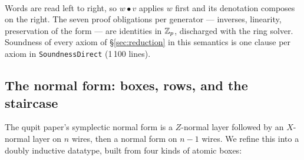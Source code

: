 \begin{code}
\AgdaSymbol{=}\AgdaSpace{}%
\AgdaSymbol{(}\AgdaSpace{}%
\AgdaOperator{\AgdaInductiveConstructor{,}}\AgdaSpace{}%
\AgdaSpace{}%
\AgdaOperator{\AgdaPostulate{+}}\AgdaSpace{}%
\AgdaSymbol{)}\AgdaSpace{}%
\AgdaSpace{}%
\AgdaSymbol{(}\AgdaSpace{}%
\AgdaOperator{\AgdaInductiveConstructor{,}}\AgdaSpace{}%
\AgdaSpace{}%
\AgdaOperator{\AgdaPostulate{+}}\AgdaSpace{}%
\AgdaSymbol{)}\AgdaSpace{}%
\AgdaSpace{}%
\<%
\\
\>[0]\AgdaSpace{}%
\AgdaSymbol{(}\AgdaSpace{}%
\AgdaSymbol{)}%
\>[21]\AgdaSymbol{(}\AgdaSpace{}%
\AgdaSpace{}%
\AgdaSymbol{)}%
\>[48]\AgdaSymbol{=}\AgdaSpace{}%
\AgdaSpace{}%
\AgdaSpace{}%
\AgdaSpace{}%
\AgdaSpace{}%
\<%
\end{code}
\endgroup

\noindent Words are read left to right, so $w \bullet v$ applies $w$
first and its denotation composes on the right.  The seven proof
obligations per
generator --- inverses, linearity, preservation of the form --- are
identities in $\mathbb{Z}_p$, discharged with the ring solver.  Soundness of
every axiom of \S\ref{sec:reduction} in this semantics is one clause per
axiom in \texttt{SoundnessDirect} (1\,100 lines).

\subsection{The normal form: boxes, rows, and the staircase}\label{sec:nf}

The qupit paper's symplectic normal form is a $Z$-normal layer followed
by an $X$-normal layer on $n$ wires, then a normal form on $n-1$ wires.
We refine this into a doubly inductive datatype, built from four kinds
of atomic boxes:

